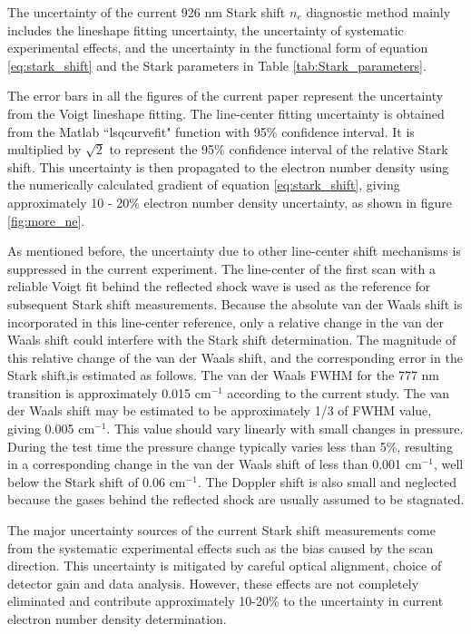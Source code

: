 \documentclass[12pt]{iopart}
\begin{document}
The uncertainty of the current 926 nm Stark shift $n_e$ diagnostic method mainly includes the lineshape fitting uncertainty, the uncertainty of systematic experimental effects, and the uncertainty in the functional form of equation \ref{eq:stark_shift} and the Stark parameters in Table \ref{tab:Stark_parameters}.

The error bars in all the figures of the current paper represent the uncertainty from the Voigt lineshape fitting. The line-center fitting uncertainty is obtained from the Matlab ``lsqcurvefit" function with 95\% confidence interval. It is multiplied by $\sqrt{2}$ to represent the 95\% confidence interval of the relative Stark shift. This uncertainty is then propagated to the electron number density using the numerically calculated gradient of equation \ref{eq:stark_shift}, giving approximately 10 - 20\% electron number density uncertainty, as shown in figure \ref{fig:more_ne}.
   
As mentioned before, the uncertainty due to other line-center shift mechanisms is suppressed in the current experiment. The line-center of the first scan with a reliable Voigt fit behind the reflected shock wave is used as the reference for subsequent Stark shift measurements. Because the absolute van der Waals shift is incorporated in this line-center reference, only a relative change in the van der Waals shift could interfere with the Stark shift determination. The magnitude of this relative change of the van der Waals shift, and the corresponding error in the Stark shift,is estimated as follows.  The van der Waals FWHM for the 777 nm transition is approximately 0.015 cm$^{-1}$ according to the current study. The van der Waals shift may be estimated\cite{Konjevic2012} to be approximately 1/3 of FWHM value, giving 0.005 cm$^{-1}$. This value should vary linearly with small changes in pressure. During the test time the pressure change typically varies less than 5\%, resulting in a corresponding change in the van der Waals shift of less than 0.001 cm$^{-1}$, well below the Stark shift of 0.06 cm$^{-1}$. The Doppler shift is also small and neglected because the gases behind the reflected shock are usually assumed to be stagnated.

The major uncertainty sources of the current Stark shift measurements come from the systematic experimental effects such as the bias caused by the scan direction. This uncertainty is mitigated by careful optical alignment, choice of detector gain and data analysis. However, these effects are not completely eliminated and contribute approximately 10-20\% to the uncertainty in current electron number density determination.  
\end{document}
